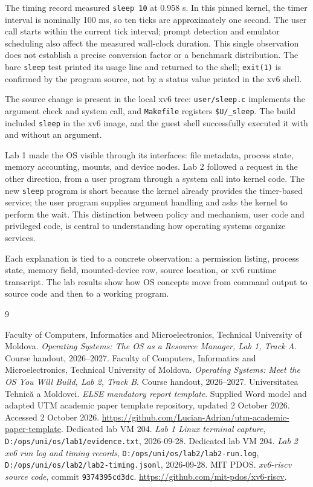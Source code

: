 \documentclass{assets/utmreport}
\begin{document}
The timing record measured \texttt{sleep 10} at 0.958 s. In this pinned kernel, the timer interval is nominally 100 ms, so ten ticks are approximately one second. The user call starts within the current tick interval; prompt detection and emulator scheduling also affect the measured wall-clock duration. This single observation does not establish a precise conversion factor or a benchmark distribution. The bare \texttt{sleep} test printed its usage line and returned to the shell; \texttt{exit(1)} is confirmed by the program source, not by a status value printed in the xv6 shell.

The source change is present in the local xv6 tree: \texttt{user/sleep.c} implements the argument check and system call, and \texttt{Makefile} registers \texttt{\$U/\_sleep}. The build included \texttt{sleep} in the xv6 image, and the guest shell successfully executed it with and without an argument.

\utmconclusions

Lab 1 made the OS visible through its interfaces: file metadata, process state, memory accounting, mounts, and device nodes. Lab 2 followed a request in the other direction, from a user program through a system call into kernel code. The new \texttt{sleep} program is short because the kernel already provides the timer-based service; the user program supplies argument handling and asks the kernel to perform the wait. This distinction between policy and mechanism, user code and privileged code, is central to understanding how operating systems organize services.

Each explanation is tied to a concrete observation: a permission listing, process state, memory field, mounted-device row, source location, or xv6 runtime transcript. The lab results show how OS concepts move from command output to source code and then to a working program.

\begin{thebibliography}{9}

 Faculty of Computers, Informatics and Microelectronics, Technical University of Moldova. \textit{Operating Systems: The OS as a Resource Manager, Lab 1, Track A}. Course handout, 2026--2027.
 Faculty of Computers, Informatics and Microelectronics, Technical University of Moldova. \textit{Operating Systems: Meet the OS You Will Build, Lab 2, Track B}. Course handout, 2026--2027.
 Universitatea Tehnică a Moldovei. \textit{ELSE mandatory report template}. Supplied Word model and adapted UTM academic paper template repository, updated 2 October 2026. Accessed 2 October 2026. \url{https://github.com/Lucian-Adrian/utm-academic-paper-template}.
 Dedicated lab VM 204. \textit{Lab 1 Linux terminal capture}, \texttt{D:/ops/uni/os/lab1/evidence.txt}, 2026-09-28.
 Dedicated lab VM 204. \textit{Lab 2 xv6 run log and timing records}, \texttt{D:/ops/uni/os/lab2/lab2-run.log}, \texttt{D:/ops/uni/os/lab2/lab2-timing.jsonl}, 2026-09-28.
 MIT PDOS. \textit{xv6-riscv source code}, commit \texttt{9374395cd3dc}. \url{https://github.com/mit-pdos/xv6-riscv}.
\end{thebibliography}
\end{document}
